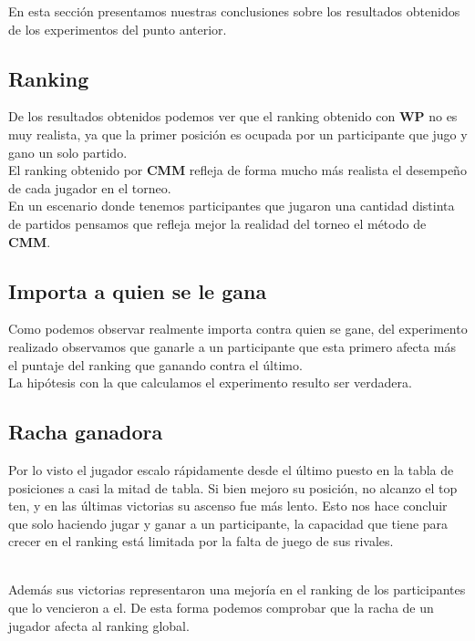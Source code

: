 En esta sección presentamos nuestras conclusiones sobre los resultados obtenidos de los experimentos del punto anterior. \\

\subsection{Ranking}

De los resultados obtenidos podemos ver que el ranking obtenido con \textbf{WP} no es muy realista, ya que la primer posición es ocupada por un participante que jugo y gano un solo partido. \\

El ranking obtenido por \textbf{CMM} refleja de forma mucho m\'as realista el desempeño de cada jugador en el torneo. \\

En un escenario donde tenemos participantes que jugaron una cantidad distinta de partidos pensamos que refleja mejor la realidad del torneo el método de \textbf{CMM}. \\


\subsection{\¿Importa a quien se le gana\?}

Como podemos observar realmente importa contra quien se gane, del experimento realizado observamos que ganarle a un participante que esta primero afecta m\'as el puntaje del ranking que ganando 
contra el último. \\

La hipótesis con la que calculamos el experimento resulto ser verdadera.  \\


\subsection{Racha ganadora}

Por lo visto el jugador escalo rápidamente desde el último puesto en la tabla de posiciones a casi la mitad de tabla. Si bien mejoro su posición, no alcanzo el top ten, y en las últimas victorias su ascenso fue m\'as lento. Esto nos hace concluir que solo haciendo jugar y ganar a un participante, la capacidad que tiene para crecer en el ranking está limitada por la falta de juego de sus rivales.

\\
Además sus victorias representaron una mejoría en el ranking de los participantes que lo vencieron a el. De esta forma podemos comprobar que la racha de un jugador afecta al ranking global.\\


